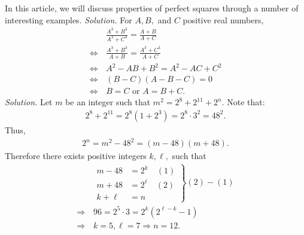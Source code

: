\begin{multicols}{2}
	In this article, we will discuss properties of perfect squares through a number of interesting examples.
	\vskip 0.2cm
	\vskip 0.1cm
	\textit{Solution.}
	For $A, B,$ and $C$ positive real numbers,
	\begin{align*}
		&\frac{A^3+B^3}{A^3+C^3} = \frac{A+B}{A+C} \\
		\Leftrightarrow\, &\frac{A^3+B^3}{A+B} = \frac{A^3+C^3}{A+C}\\
		\Leftrightarrow\, &A^2 - AB + B^2 = A^2 - AC + C^2\\
		\Leftrightarrow\, &(B-C)(A-B-C) = 0 \\
		\Leftrightarrow\, &{B=C} \text{\ or\ } {A = B+C.}
	\end{align*}
	\vskip 0.1cm
	\textit{Solution.}
	Let $m$ be an integer such that \linebreak $m^2 = 2^8 + 2^{11} + 2^n.$ Note that:
	\begin{align*}
		2^8 + 2^{11} = 2^8(1+2^3) = 2^8 \cdot 3^2 = 48^2.
	\end{align*}
		Thus,
		\begin{align*}
			2^n = m^2 - 48^2 = (m-48)(m+48).
		\end{align*}
		Therefore there exists positive integers $k, \ell,$ such that
		\begin{align*}
			&\left.
			\begin{aligned}
				m-48 &= 2^k \quad (1)\\
				m+48 &= 2^{\ell} \quad (2)\\
				k + \ell &= n
			\end{aligned}
			\right\}
			(2) - (1) \\
			\Rightarrow \,&96 = 2^5 \cdot 3 = 2^k(2^{\ell-k}-1)\\
			\Rightarrow \,&k = 5, \ell = 7 \Rightarrow {n = 12.}
		\end{align*}

\end{multicols}
